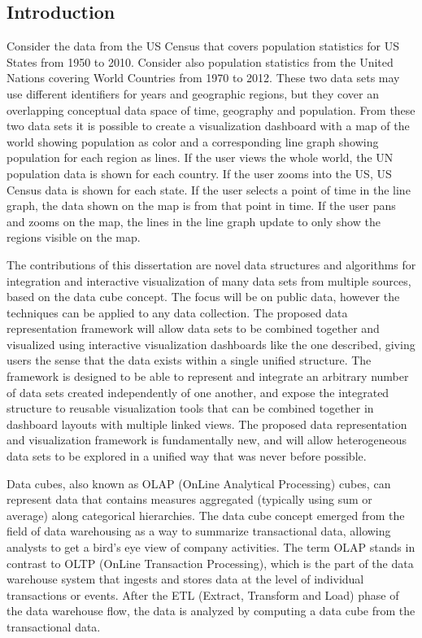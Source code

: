 \documentclass[12pt]{article}
\begin{document}
\begin{doublespace}
\section{Introduction}
Consider the data from the US Census that covers population statistics for US States from 1950 to 2010. Consider also population statistics from the United Nations covering World Countries from 1970 to 2012. These two data sets may use different identifiers for years and geographic regions, but they cover an overlapping conceptual data space of time, geography and population. From these two data sets it is possible to create a visualization dashboard with a map of the world showing population as color and a corresponding line graph showing population for each region as lines. If the user views the whole world, the UN population data is shown for each country. If the user zooms into the US, US Census data is shown for each state. If the user selects a point of time in the line graph, the data shown on the map is from that point in time. If the user pans and zooms on the map, the lines in the line graph update to only show the regions visible on the map.

The contributions of this dissertation are novel data structures and algorithms for integration and interactive visualization of many data sets from multiple sources, based on the data cube concept. The focus will be on public data, however the techniques can be applied to any data collection. The proposed data representation framework will allow data sets to be combined together and visualized using interactive visualization dashboards like the one described, giving users the sense that the data exists within a single unified structure. The framework is designed to be able to represent and integrate an arbitrary number of data sets created independently of one another, and expose the integrated structure to reusable visualization tools that can be combined together in dashboard layouts with multiple linked views. The proposed data representation and visualization framework is fundamentally new, and will allow heterogeneous data sets to be explored in a unified way that was never before possible. 

Data cubes, also known as OLAP (OnLine Analytical Processing) cubes, can represent data that contains measures aggregated (typically using sum or average) along categorical hierarchies. The data cube concept emerged from the field of data warehousing as a way to summarize transactional data, allowing analysts to get a bird's eye view of company activities. The term OLAP stands in contrast to OLTP (OnLine Transaction Processing), which is the part of the data warehouse system that ingests and stores data at the level of individual transactions or events. After the ETL (Extract, Transform and Load) phase of the data warehouse flow, the data is analyzed by computing a data cube from the transactional data.


\end{doublespace}
\end{document}
